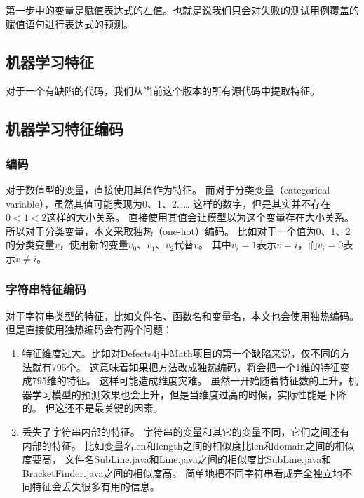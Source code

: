 第一步中的变量是赋值表达式的左值。也就是说我们只会对失败的测试用例覆盖的赋值语句进行表达式的预测。

\subsection{机器学习特征}

对于一个有缺陷的代码，我们从当前这个版本的所有源代码中提取特征。

\subsection{机器学习特征编码}

\subsubsection{编码}

对于数值型的变量，直接使用其值作为特征。
而对于分类变量（categorical variable），虽然其值可能表现为0、1、2……
这样的数字，但是其实并不存在$0 < 1 < 2$这样的大小关系。
直接使用其值会让模型以为这个变量存在大小关系。
所以对于分类变量，本文采取独热（one-hot）编码。
比如对于一个值为0、1、2的分类变量$v$，使用新的变量$v_0$、$v_1$、$v_2$代替$v$。
其中$v_i = 1$表示$v = i$，而$v_i = 0$表示$v \ne i$。

\subsubsection{字符串特征编码}

对于字符串类型的特征，比如文件名、函数名和变量名，本文也会使用独热编码。
但是直接使用独热编码会有两个问题：
\begin{enumerate}
\item 特征维度过大。比如对Defects4j中Math项目的第一个缺陷来说，仅不同的方法就有795个。
这意味着如果把方法改成独热编码，将会把一个1维的特征变成795维的特征。
这样可能造成维度灾难\parencite{Richard1957Dynamic}。
虽然一开始随着特征数的上升，机器学习模型的预测效果也会上升，但是当维度过高的时候，实际性能是下降的。
但这还不是最关键的因素。
\item 丢失了字符串内部的特征。
字符串的变量和其它的变量不同，它们之间还有内部的特征。
比如变量名len和length之间的相似度比len和domain之间的相似度要高，
文件名SubLine.java和Line.java之间的相似度比SubLine.java和BracketFinder.java之间的相似度高。
简单地把不同字符串看成完全独立地不同特征会丢失很多有用的信息。
\end{enumerate}

